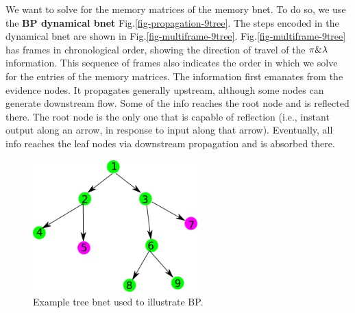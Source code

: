 We want to solve for the 
memory matrices of the 
memory bnet. To do so,
we use the {\bf BP dynamical bnet}
Fig.\ref{fig-propagation-9tree}.
The steps encoded
in the dynamical bnet
are shown in Fig.\ref{fig-multiframe-9tree}.
Fig.\ref{fig-multiframe-9tree}
has frames in chronological order,
showing the direction of travel
of the $\pi\&\lambda$ information. 
This sequence of frames also indicates 
the order
in which we solve for the entries of
 the memory matrices.
The information first emanates from the evidence nodes.
It propagates generally upstream,
although some nodes
can generate downstream flow. Some of the 
info  reaches the root node and is  reflected there.
The root node is the only one that 
is capable of reflection (i.e., instant output
along an arrow, 
in response to input along that arrow).
Eventually, all info
reaches the leaf nodes 
via downstream propagation and is absorbed there.


\begin{figure}[h!]
\centering
\includegraphics[width=2.5in]
{mpass/mp-9tree.png}
\caption{Example tree bnet
used to illustrate BP.
} 
\label{fig-mp-9tree}
\end{figure}



